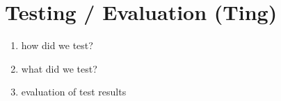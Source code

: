 
\section{Testing / Evaluation (Ting)}
\begin{enumerate}
    \item how did we test?
    \item what did we test?
    \item evaluation of test results
\end{enumerate}

